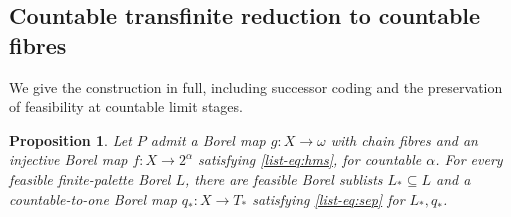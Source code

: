 \documentclass[11pt,reqno]{amsart}
\theoremstyle{plain}
\newtheorem{proposition}[theorem]{Proposition}
\theoremstyle{definition}
\theoremstyle{remark}
\begin{document}
\subsection{Countable transfinite reduction to countable fibres}

We give the construction in full, including successor coding and the
preservation of feasibility at countable limit stages.

\begin{proposition}\label{list-prop:countable-parts}
Let $P$ admit a Borel map $g:X\to\omega$ with chain fibres and an injective
Borel map $f:X\to2^\alpha$ satisfying \eqref{list-eq:hms}, for countable
$\alpha$. For every feasible finite-palette Borel $L$, there are feasible
Borel sublists $L_\ast\subseteq L$ and a countable-to-one Borel map
$q_\ast:X\to T_\ast$ satisfying \eqref{list-eq:sep} for $L_\ast,q_\ast$.
\end{proposition}
\end{document}
